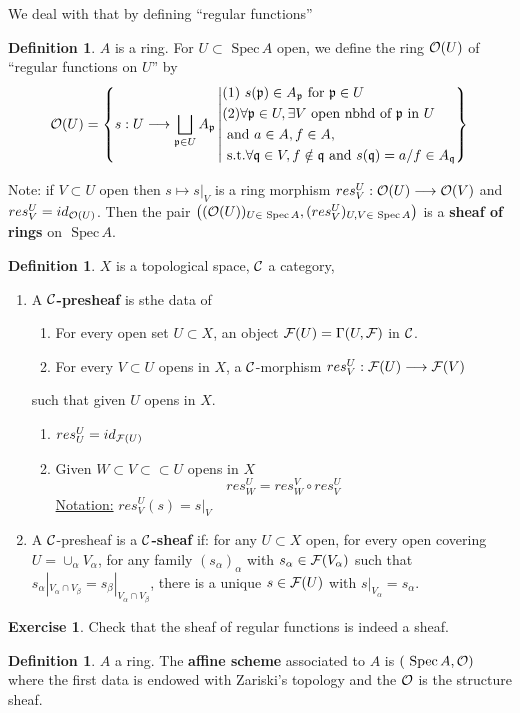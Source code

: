 \documentclass[11pt]{article}
\theoremstyle{definition}
\newtheorem{dfn}[thm]{Definition}
\newtheorem{exercise}[thm]{Exercise}
\newcommand{\spec}{\text{ Spec}\,}
\newcommand{\scp}{{\mathfrak p}}
\newcommand{\scq}{\mathfrak q}
\newcommand{\calf}{{\cal F}}
\newcommand{\calc}{{\cal C}}
\newcommand{\calo}{{\cal O}}
\newcommand{\lrta}{\longrightarrow}
\begin{document}
We deal with that by defining ``regular functions''
\begin{dfn}
$A$ is a ring. For $U\subset \spec A$ open, we define the ring $\calo(U)$ of ``regular functions on $U$'' by 
$$
\calo(U)=
\left\{s:U\lrta \bigsqcup_{\scp\in U}A_\scp\left| \begin{aligned}
& \text{(1) $s(\scp)\in A_\scp$ for $\scp \in U$}\\
&\text{(2)} \forall \scp\in U, \exists V \text{ open  nbhd of } \scp \text{ in } U\\
& \text{ and } a\in A, f\in A,\\
& \text{ s.t.} \forall \scq\in V, f\notin \scq \text{ and } s(\scq)=a/f\in A_\scq\\
\end{aligned}\right\}
\right.
$$
\end{dfn}
Note: if $V\subset U$ open then $s\mapsto s|_V$ is a ring morphism $res^U_V:\calo(U)\lrta \calo(V)$ and $res^U_V=id_{\calo(U)}$. Then the pair $\left((\calo(U))_{U\in\spec A}, (res^U_V)_{U,V\in \spec A}\right)$ is a \textbf{ sheaf of rings } on $\spec A$. 
\begin{dfn}
$X$ is a topological space, $\calc$ a category,
\begin{enumerate}[label=(\arabic*)]
\item A \textbf{$\calc$-presheaf} is sthe data of 
\begin{enumerate}[label=(\alph*)]
\item For every open set $U\subset X$, an object $\calf(U)=\Gamma(U,\calf)$ in $\calc$.
\item For every $V\subset U$ opens in $X$, a $\calc$-morphism $res^U_V: \calf(U)\lrta \calf(V)$
\end{enumerate}
such that given $U$ opens in $X$.
\begin{enumerate}[label=(\roman*)]
\item $res^U_U=id_{\calf(U)}$
\item Given $W\subset V\subset \subset U$ opens in $X$
$$
res^U_W=res^V_W\circ res^U_V
$$
\underline{Notation:} $res^U_V(s)=s|_V$
\end{enumerate}

\item A $\calc$-presheaf is a \textbf{$\calc$-sheaf} if: for any $U\subset X$ open, for every open covering $U=\cup_\alpha V_\alpha$, for any family $(s_\alpha)_\alpha$ with $s_\alpha\in \calf(V_\alpha)$ such that $s_\alpha|_{V_\alpha\cap V_\beta}=s_{\beta}|_{V_\alpha\cap V_\beta}$, there is a unique $s\in \calf(U)$ with $s|_{V_\alpha}=s_\alpha$.
\end{enumerate}
\end{dfn}
\begin{exercise}
Check that the sheaf of regular functions is indeed a sheaf.
\end{exercise}
\begin{dfn}
$A$ a ring. The \textbf{affine scheme} associated to $A$ is $(\spec A,\calo)$ where the first data is endowed with Zariski's topology and the $\calo$ is the structure sheaf.
\end{dfn}
\end{document}
